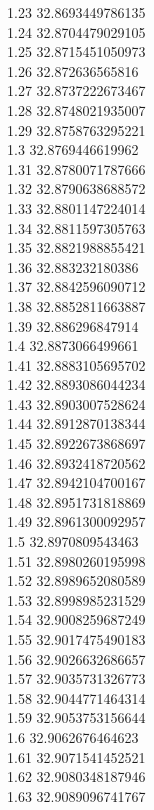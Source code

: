{1.23	32.8693449786135\\
1.24	32.8704479029105\\
1.25	32.8715451050973\\
1.26	32.872636565816\\
1.27	32.8737222673467\\
1.28	32.8748021935007\\
1.29	32.8758763295221\\
1.3	32.8769446619962\\
1.31	32.8780071787666\\
1.32	32.8790638688572\\
1.33	32.8801147224014\\
1.34	32.8811597305763\\
1.35	32.8821988855421\\
1.36	32.883232180386\\
1.37	32.8842596090712\\
1.38	32.8852811663887\\
1.39	32.886296847914\\
1.4	32.8873066499661\\
1.41	32.8883105695702\\
1.42	32.8893086044234\\
1.43	32.8903007528624\\
1.44	32.8912870138344\\
1.45	32.8922673868697\\
1.46	32.8932418720562\\
1.47	32.8942104700167\\
1.48	32.8951731818869\\
1.49	32.8961300092957\\
1.5	32.8970809543463\\
1.51	32.8980260195998\\
1.52	32.8989652080589\\
1.53	32.8998985231529\\
1.54	32.9008259687249\\
1.55	32.9017475490183\\
1.56	32.9026632686657\\
1.57	32.9035731326773\\
1.58	32.9044771464314\\
1.59	32.9053753156644\\
1.6	32.9062676464623\\
1.61	32.9071541452521\\
1.62	32.9080348187946\\
1.63	32.9089096741767\\
}
